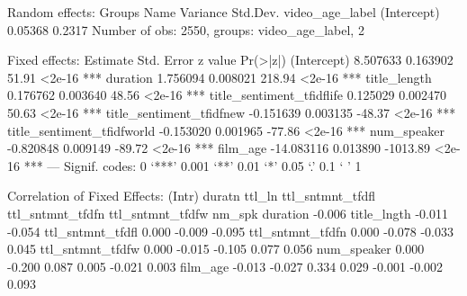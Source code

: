 Random effects:
 Groups          Name        Variance Std.Dev.
 video_age_label (Intercept) 0.05368  0.2317  
Number of obs: 2550, groups:  video_age_label, 2

Fixed effects:
                             Estimate Std. Error  z value Pr(>|z|)    
(Intercept)                  8.507633   0.163902    51.91   <2e-16 ***
duration                     1.756094   0.008021   218.94   <2e-16 ***
title_length                 0.176762   0.003640    48.56   <2e-16 ***
title_sentiment_tfidflife    0.125029   0.002470    50.63   <2e-16 ***
title_sentiment_tfidfnew    -0.151639   0.003135   -48.37   <2e-16 ***
title_sentiment_tfidfworld  -0.153020   0.001965   -77.86   <2e-16 ***
num_speaker                 -0.820848   0.009149   -89.72   <2e-16 ***
film_age                   -14.083116   0.013890 -1013.89   <2e-16 ***
---
Signif. codes:  0 ‘***’ 0.001 ‘**’ 0.01 ‘*’ 0.05 ‘.’ 0.1 ‘ ’ 1

Correlation of Fixed Effects:
                 (Intr) duratn ttl_ln ttl_sntmnt_tfdfl ttl_sntmnt_tfdfn ttl_sntmnt_tfdfw nm_spk
duration         -0.006                                                                        
title_lngth      -0.011 -0.054                                                                 
ttl_sntmnt_tfdfl  0.000 -0.009 -0.095                                                          
ttl_sntmnt_tfdfn  0.000 -0.078 -0.033  0.045                                                   
ttl_sntmnt_tfdfw  0.000 -0.015 -0.105  0.077            0.056                                  
num_speaker       0.000 -0.200  0.087  0.005           -0.021            0.003                 
film_age         -0.013 -0.027  0.334  0.029           -0.001           -0.002            0.093
